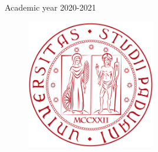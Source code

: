 \begin{titlepage}
	\vspace{0.5\baselineskip} %

	{\small Academic year 2020-2021}

	\vspace*{4\baselineskip}

	\begin{figure}[!h]
		\centering
		\includegraphics[width=0.5\textwidth]{../frontespizio/UNIPD.png}%
	\end{figure}

	\vfill %

%
%
%
%

\end{titlepage}

\clearpage{\pagestyle{empty}\cleardoublepage}
